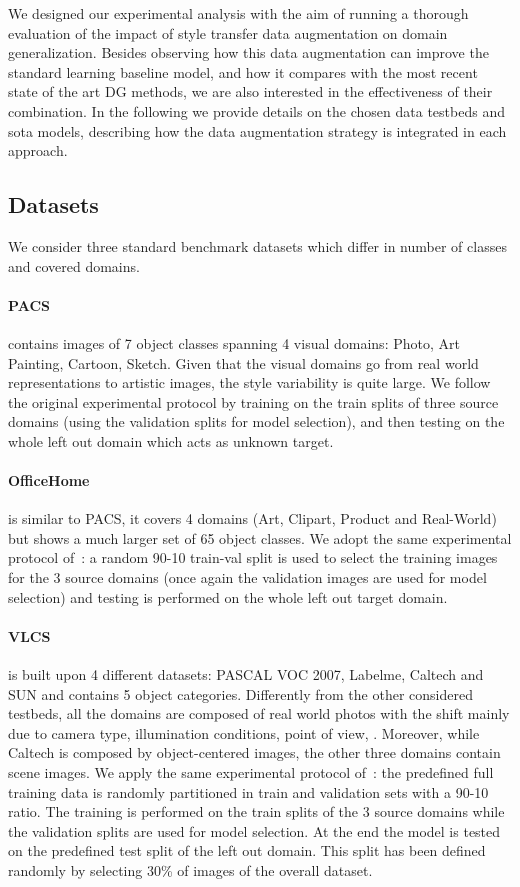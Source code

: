 We designed our experimental analysis with the aim of running a thorough evaluation of the impact of style transfer data augmentation on domain generalization. Besides observing how this data augmentation can improve the standard learning baseline model, and how it compares with the most recent state of the art DG methods, we are also interested in the effectiveness of their combination. 
In the following we provide details on the chosen data testbeds and sota models, describing how the data augmentation strategy is integrated in each approach.

\subsection{Datasets}
We consider three standard benchmark datasets which differ in number of classes and covered domains. 

\paragraph{PACS~\cite{hospedalesPACS}} contains images of 7 object classes spanning 4 visual domains: Photo, Art Painting, Cartoon, Sketch. Given that the visual domains go from real world representations to artistic images, the style variability is quite large. We follow the original experimental protocol by training on the train splits of three source domains (using the validation splits for model selection), and then testing on the whole left out domain which acts as unknown target.  
\paragraph{OfficeHome~\cite{venkateswara2017Deep}} 
is similar to PACS, it covers 4 domains (Art, Clipart, Product and Real-World) but shows a much larger set of 65 object classes. We adopt the same experimental protocol of~\cite{Antonio_GCPR18}: a random 90-10 train-val split is used to select the training images for the 3 source domains (once again the validation images are used for model selection) and testing is performed on the whole left out target domain.
\paragraph{VLCS~\cite{TorralbaEfros_bias}} is built upon 4 different datasets: PASCAL VOC 2007, Labelme, Caltech and SUN and contains 5 object categories. Differently from the other considered testbeds, all the domains are composed of real world photos with the shift mainly due to camera type, illumination conditions, point of view,  \etc. Moreover, while Caltech is composed by object-centered images, the other three domains  contain scene images.
We apply the same experimental protocol of~\cite{jigsawCVPR19}: the predefined full training data is randomly partitioned in train and validation sets with a 90-10 ratio. The training is performed on the train splits of the 3 source domains while the validation splits are used for model selection. At the end the model is tested on the predefined test split of the left out domain. This split has been defined randomly by selecting 30\% of images of the overall dataset.

